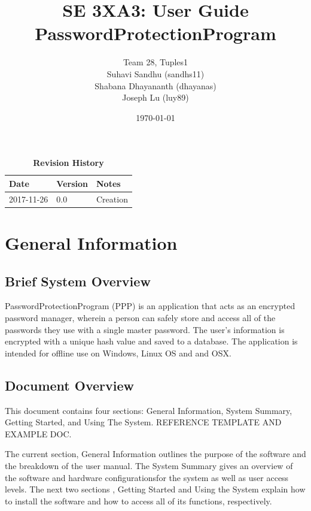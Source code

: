 \documentclass[12pt, titlepage]{article}
\title{SE 3XA3: User Guide\\PasswordProtectionProgram}
\author{Team 28, Tuples1
		\\ Suhavi Sandhu (sandhs11)
		\\ Shabana Dhayananth (dhayanas)
		\\ Joseph Lu (luy89)
}
\date{\today}
\begin{document}
\maketitle

\tableofcontents
\listoftables
\listoffigures

\begin{table}[bp]
\caption{\bf Revision History}
\begin{tabularx}{\textwidth}{p{3cm}p{2cm}X}
\toprule {\bf Date} & {\bf Version} & {\bf Notes}\\
\midrule
2017-11-26 & 0.0 & Creation\\
\bottomrule
\end{tabularx}
\end{table}

\newpage


\section{General Information}\label{Intro}

\subsection{Brief System Overview} \label{ProjOver}
PasswordProtectionProgram (PPP) is an application that acts as an encrypted password manager, wherein a person can safely store and access all of the passwords they use with a single master password. The user's information is encrypted with a unique hash value and saved to a database. The application is intended for offline use on Windows, Linux OS and and OSX.

\subsection{Document Overview} \label{DocOver}
This document contains four sections: General Information, System Summary, Getting Started, and Using The System. REFERENCE TEMPLATE AND EXAMPLE DOC.

The current section, General Information outlines the purpose of the software and the breakdown of the user manual. The System Summary gives an overview of the software and hardware configurationsfor the system as well as user access levels. The next two sections , Getting Started and Using the System explain how to install the software and how to access all of its functions, respectively.
\end{document}
